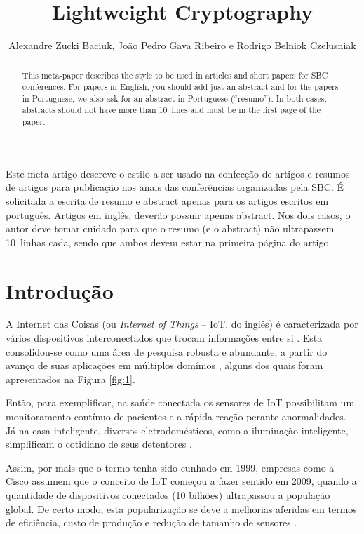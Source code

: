 \documentclass{SBCbookchapter}
\author{Alexandre Zucki Baciuk, João Pedro Gava Ribeiro e Rodrigo Belniok Czelusniak}
\title{Lightweight Cryptography}
\begin{document}
\maketitle

\begin{abstract}
This meta-paper describes the style to be used in articles and short
papers for SBC conferences. For papers in English, you should add just
an abstract and for the papers in Portuguese, we also ask for an
abstract in Portuguese (``resumo''). In both cases, abstracts should not
have more than 10~lines and must be in the first page of the paper.
\end{abstract}

\begin{resumo}
\begin{otherlanguage}{brazil}
Este meta-artigo descreve o estilo a ser usado na confecção de artigos
e resumos de artigos para publicação nos anais das conferências
organizadas pela SBC. É solicitada a escrita de resumo e abstract apenas
para os artigos escritos em português. Artigos em inglês, deverão
possuir apenas abstract. Nos dois casos, o autor deve tomar cuidado para
que o resumo (e o abstract) não ultrapassem 10~linhas cada, sendo que
ambos devem estar na primeira página do artigo.
\end{otherlanguage}
\end{resumo}

\section{Introdução}

A Internet das Coisas (ou \textit{Internet of Things} -- IoT, do inglês) é caracterizada por vários dispositivos interconectados que trocam informações entre si \cite{dutta:2019}. Esta consolidou-se como uma área de pesquisa robusta e abundante, a partir do avanço de suas aplicações em múltiplos domínios \cite{thakor:2020}, alguns dos quais foram apresentados na Figura \ref{fig:1}.

Então, para exemplificar, na saúde conectada os sensores de IoT possibilitam um monitoramento contínuo de pacientes e a rápida reação perante anormalidades. Já na casa inteligente, diversos eletrodomésticos, como a iluminação inteligente, simplificam o cotidiano de seus detentores \cite{sembroiz:2018}.

Assim, por mais que o termo tenha sido cunhado em 1999, empresas como a Cisco assumem que o conceito de IoT começou a fazer sentido em 2009, quando a quantidade de dispositivos conectados (10 bilhões) ultrapassou a população global. De certo modo, esta popularização se deve a melhorias aferidas em termos de eficiência, custo de produção e redução de tamanho de sensores \cite{sembroiz:2018}.
\end{document}
